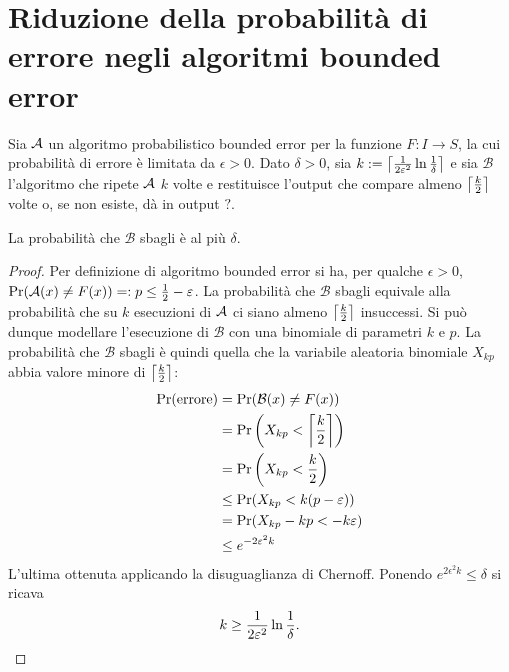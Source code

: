 \section{Riduzione della probabilità di errore negli algoritmi bounded error}
\newcommand{\Balg}{\mathcal B}

Sia $\Aalg$ un algoritmo probabilistico bounded error per la funzione $F:I\to S$, la cui probabilità di errore è limitata da $\epsilon>0$.
Dato $\delta>0$, sia $k:=\ceil{\frac{1}{2\epsilon^2}\ln\frac{1}{\delta}}$ e sia $\Balg$ l'algoritmo che ripete $\Aalg$ $k$ volte e restituisce l'output che compare almeno $\ceil{\frac k2}$ volte o, se non esiste, dà in output $?$.

\begin{thm}
	La probabilità che $\Balg$ sbagli è al più $\delta$.
\end{thm}
\begin{proof}
	Per definizione di algoritmo bounded error si ha, per qualche $\epsilon>0$, $\Pr(\Aalg(x)\ne F(x))=:p\le\frac 12-\epsilon$.
	La probabilità che $\Balg$ sbagli equivale alla probabilità che su $k$ esecuzioni di $\Aalg$ ci siano almeno $\ceil{\frac k2}$ insuccessi.
	Si può dunque modellare l'esecuzione di $\Balg$ con una binomiale di parametri $k$ e $p$. La probabilità che $\Balg$ sbagli è quindi quella che la variabile aleatoria binomiale $X_{kp}$ abbia valore minore di $\ceil{\frac k2}$:
	\begin{align*}
		\Pr(\text{errore}) & = \Pr(\Balg(x)\ne F(x))                  \\
		                   & = \Pr\left(X_{kp}<\ceil{\frac k2}\right) \\
		                   & = \Pr\left(X_{kp}<\frac k2\right)        \\
		                   & \le \Pr(X_{kp}<k(p-\epsilon))            \\
		                   & = \Pr(X_{kp}-kp<-k\epsilon)              \\
		                   & \le e^{-2\epsilon^2 k}
	\end{align*}
	L'ultima ottenuta applicando la disuguaglianza di Chernoff. Ponendo $e^{2\epsilon^2 k}\le\delta$ si ricava
	\begin{equation*}
		k\ge\frac{1}{2\epsilon^2}\ln\frac{1}{\delta} \text. \qedhere
	\end{equation*}
\end{proof}
